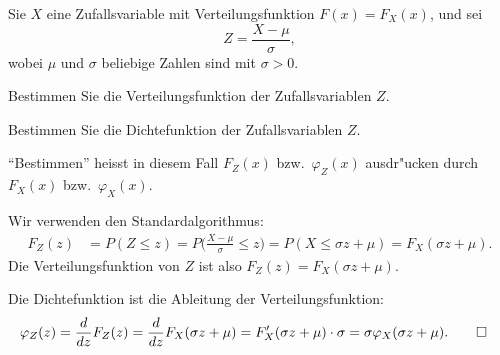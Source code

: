 Sie $X$ eine Zufallsvariable mit Verteilungsfunktion $F(x)=F_X(x)$, und
sei\[
Z=\frac{X-\mu}{\sigma},
\]
wobei $\mu$ und $\sigma$ beliebige Zahlen sind mit $\sigma > 0$.

\begin{teilaufgaben}
\item Bestimmen Sie die Verteilungsfunktion der Zufallsvariablen $Z$.
\item Bestimmen Sie die Dichtefunktion der Zufallsvariablen $Z$.
\end{teilaufgaben}
\begin{hinweis}
``Bestimmen'' heisst in diesem Fall $F_Z(x)$ bzw.~$\varphi_Z(x)$ ausdr"ucken durch
$F_X(x)$ bzw.~$\varphi_X(x)$.
\end{hinweis}

\begin{loesung}
\begin{teilaufgaben}
\item Wir verwenden den Standardalgorithmus:
\begin{align*}
F_Z(z)&=P(Z\le z)
=P\biggl(\frac{X-\mu}{\sigma}\le z\biggr)
=P(X\le \sigma z+\mu)=F_X(\sigma z+\mu).
\end{align*}
Die Verteilungsfunktion von $Z$ ist also $F_Z(z)=F_X(\sigma z+\mu)$.
\item Die Dichtefunktion ist die Ableitung der Verteilungsfunktion:
\begin{align*}
\varphi_Z(z)&=\frac{d}{dz}F_Z(z)
=\frac{d}{dz}F_X(\sigma z+ \mu)
=F_X'(\sigma z+ \mu)\cdot \sigma=\sigma\varphi_X(\sigma z+\mu).
\qedhere
\end{align*}
\end{teilaufgaben}
\end{loesung}

